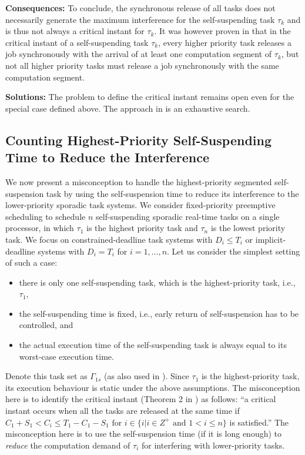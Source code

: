 {\bf Consequences:} To conclude, the synchronous release of all tasks does not necessarily generate the maximum interference for the self-suspending task $\tau_k$ and is thus not always a critical instant for $\tau_k$. 
It was however proven in \cite{ecrts15nelissen} that in the critical instant of a self-suspending task $\tau_k$, every higher priority task releases a job synchronously with the arrival of at least one computation segment of $\tau_k$, but not all higher priority tasks must release a job synchronously with the same computation segment.

{\bf Solutions:} The problem to define the critical instant remains open even for the special case defined above. The approach in \cite{ecrts15nelissen} is an exhaustive search.

\subsection{Counting Highest-Priority Self-Suspending Time to Reduce the Interference}
\label{sec:wrong-highest-priority}

We now present a misconception to handle the highest-priority segmented self-suspension task by using the self-suspension time to reduce its interference to the lower-priority sporadic task systems. 
We consider fixed-priority preemptive scheduling to schedule $n$ self-suspending sporadic real-time tasks on a single processor, in which $\tau_1$ is the highest priority task and $\tau_n$ is the lowest priority task. We focus on constrained-deadline task systems with $D_i \leq T_i$ or implicit-deadline systems with $D_i=T_i$ for $i=1,\ldots,n$.
Let us consider the simplest setting of such a case:
\begin{itemize}
\item there is only one self-suspending task, which is the highest-priority task, i.e., $\tau_1$,
\item the self-suspending time is fixed, i.e., early return of self-suspension has to be controlled, and
\item the actual execution time of the self-suspending task is always equal to its worst-case execution time.
\end{itemize}
Denote this task set as $\Gamma_{1s}$ (as also used in \cite{RTSS-KimANR13}).  Since $\tau_1$ is the highest-priority task, its execution behaviour is static under the above assumptions. The misconception here is to identify the critical instant  (Theorem 2 in \cite{RTSS-KimANR13}) as follows: ``a critical instant occurs when all the tasks are released at the same time if $C_1 +S_1 < C_i  \leq T_1-C_1-S_1 \mbox{ for } i \in\{i|i\in Z^{+} \mbox{ and } 1<i\leq n\}$ is satisfied.'' The misconception here is to use the self-suspension time (if it is long enough) to \emph{reduce} the computation demand of $\tau_i$ for interfering with lower-priority tasks. 


